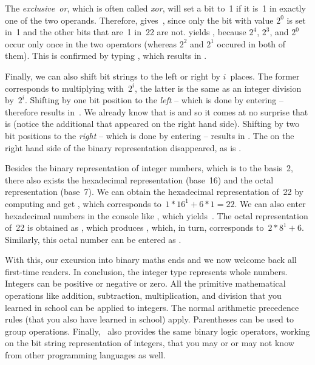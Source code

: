 The \emph{exclusive~or}, which is often called \emph{xor}, will set a bit to~1 if it is~1 in exactly one of the two operands.
Therefore,  gives~, since only the bit with value $2^0$ is set in~1 and the other bits that are~1 in~22 are not.
 yields , because $2^4$, $2^3$, and $2^0$ occur only once in the two operators (whereas $2^2$ and $2^1$ occured in both of them).
This is confirmed by typing , which results in .

Finally, we can also shift bit strings to the left or right by $i$~places.
The former corresponds to multiplying with~$2^i$, the latter is the same as an integer division by~$2^i$.
Shifting  by one bit position to the \emph{left} -- which is done by entering  -- therefore results in~.
We already know that  is  and so it comes at no surprise that  is  (notice the additional  that appeared on the right hand side).
Shifting  by two bit positions to the \emph{right} -- which is done by entering  -- results in .
The  on the right hand side of the binary representation disappeared, as  is .

Besides the binary representation of integer numbers, which is to the basis~2, there also exists the hexadecimal representation (base~16) and the octal representation (base~7).
We can obtain the hexadecimal representation of~22 by computing  and get , which corresponds to~$1*16^1+6*1=22$.
We can also enter hexadecimal numbers in the console like , which yields~.
The octal representation of~22 is obtained as , which produces , which, in turn, corresponds to~$2*8^1+6$.
Similarly, this octal number can be entered as .

With this, our excursion into binary maths ends and we now welcome back all first-time readers.%
%
\endhsection%
%
%
In conclusion, the integer type  represents whole numbers.
Integers can be positive or negative or zero.
All the primitive mathematical operations like addition, subtraction, multiplication, and division that you learned in school can be applied to integers.
The normal arithmetic precedence rules (that you also have learned in school) apply.
Parentheses can be used to group operations.
Finally, \python\ also provides the same binary logic operators, working on the bit string representation of integers, that you may or or may not know from other programming languages as well.
\endhsection%
\endhsection%
%
